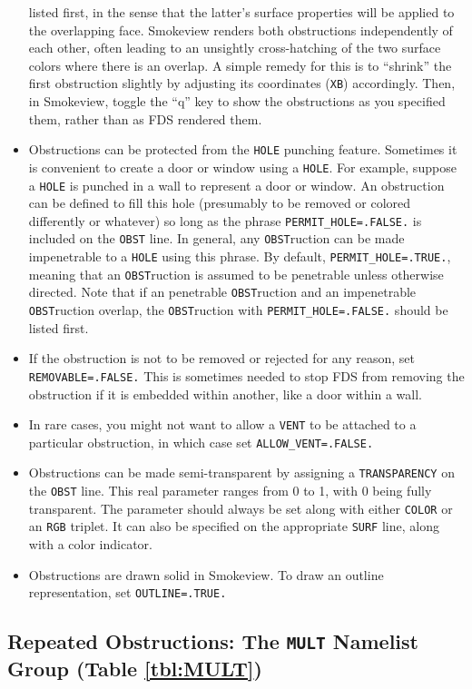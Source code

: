 \documentclass[11pt]{book}
\newcommand{\ct}{\tt\small}
\begin{document}
\begin{itemize}
listed first, in the sense that the latter's surface properties will be applied to the overlapping face. Smokeview renders both obstructions
independently of each other, often leading to an unsightly cross-hatching of the two surface colors where there is an overlap. A
simple remedy for this is to ``shrink'' the first obstruction slightly by adjusting its coordinates ({\ct XB}) accordingly. Then, in
Smokeview, toggle the ``q'' key to show the obstructions as you specified them, rather than as FDS rendered them.
\item Obstructions can be protected from the {\ct HOLE} punching feature. Sometimes
it is convenient to create a door or window using a {\ct HOLE}. For example, suppose a
{\ct HOLE} is punched in a wall to represent a door or window. An obstruction can be
defined to fill this hole (presumably to be removed or colored differently or whatever) so
long as the phrase {\ct PERMIT\_HOLE=.FALSE.} is included on the {\ct OBST} line. In general,
any {\ct OBST}ruction can be made impenetrable to a {\ct HOLE} using this phrase. By default,
{\ct PERMIT\_HOLE=.TRUE.}, meaning that an {\ct OBST}ruction is assumed to be penetrable unless otherwise directed. Note that if an penetrable  {\ct OBST}ruction
and an impenetrable  {\ct OBST}ruction overlap, the {\ct OBST}ruction with {\ct PERMIT\_HOLE=.FALSE.} should be listed first.
\item If the obstruction is not to be removed or rejected for any reason, set {\ct REMOVABLE=.FALSE.} This is sometimes needed to stop
FDS from removing the obstruction if it is embedded within another, like a door within a wall.
\item In rare cases, you might not want to allow a {\ct VENT} to be attached to a particular obstruction, in which case set
{\ct ALLOW\_VENT=.FALSE.}
\item Obstructions can be made semi-transparent by assigning a {\ct TRANSPARENCY} on the {\ct OBST} line. This real parameter ranges from
0 to 1, with 0 being fully transparent. The parameter should always be set along with either {\ct COLOR} or an {\ct RGB} triplet. It can
also be specified on the appropriate {\ct SURF} line, along with a color indicator.
\item Obstructions are drawn solid in Smokeview. To draw an outline representation, set {\ct OUTLINE=.TRUE.}
\end{itemize}


\subsection{Repeated Obstructions: The \texorpdfstring{{\tt MULT}}{MULT} Namelist Group (Table \ref{tbl:MULT})}
\label{info:MULT}
\end{document}

